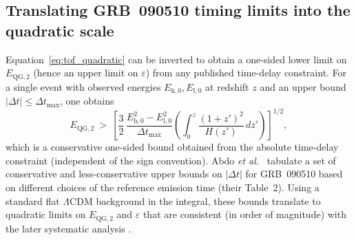 \subsection{Translating GRB~090510 timing limits into the quadratic scale}
Equation~\eqref{eq:tof_quadratic} can be inverted to obtain a one-sided lower limit on $E_{\mathrm{QG},2}$ (hence an upper limit on $\varepsilon$) from any published time-delay constraint.
For a single event with observed energies $E_{\mathrm{h},0},E_{\mathrm{l},0}$ at redshift $z$ and an upper bound $|\Delta t|\le \Delta t_{\max}$, one obtains
\begin{equation}
E_{\mathrm{QG},2}\ >\ \left[\frac{3}{2}\,\frac{E_{\mathrm{h},0}^2-E_{\mathrm{l},0}^2}{\Delta t_{\max}}
\left(\int_0^z\frac{(1+z')^2}{H(z')}\,dz'\right)\right]^{1/2},
\label{eq:eqg2_from_dt_bound}
\end{equation}
which is a conservative one-sided bound obtained from the absolute time-delay constraint (independent of the sign convention).
Abdo \emph{et al.}\ \cite{Abdo2009Nature} tabulate a set of conservative and less-conservative upper bounds on $|\Delta t|$ for GRB~090510 based on different choices of the reference emission time (their Table~2).
Using a standard flat $\Lambda$CDM background in the integral, these bounds translate to quadratic limits on $E_{\mathrm{QG},2}$ and $\varepsilon$ that are consistent (in order of magnitude) with the later systematic analysis \cite{Vasileiou2013}.

